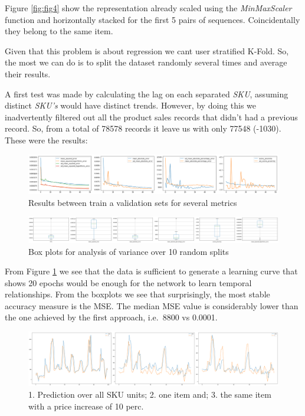 \documentclass[]{article}
\theoremstyle{definition}
\theoremstyle{definition}
\theoremstyle{definition}
\theoremstyle{remark}
\begin{document}
Figure \ref{fig:fig4} show the representation already scaled using the
\emph{MinMaxScaler} function and horizontally stacked for the first 5
pairs of sequences. Coincidentally they belong to the same item.

Given that this problem is about regression we cant user stratified
K-Fold. So, the most we can do is to split the dataset randomly several
times and average their results.

A first test was made by calculating the lag on each separated
\emph{SKU}, assuming distinct \emph{SKU's} would have distinct trends.
However, by doing this we inadvertently filtered out all the product
sales records that didn't had a previous record. So, from a total of
78578 records it leave us with only 77548 (-1030). These were the
results:

\begin{figure}

{\centering \includegraphics[width=1\linewidth]{./media/res_1} 

}

\caption{Results between train a validation sets for several metrics}\label{fig:fig5}
\end{figure}\begin{figure}

{\centering \includegraphics[width=1\linewidth]{./media/box_1} 

}

\caption{Box plots for analysis of variance over 10 random splits}\label{fig:fig6}
\end{figure}

From Figure \ref{fig:fig5} we see that the data is sufficient to
generate a learning curve that shows 20 epochs would be enough for the
network to learn temporal relationships. From the boxplots we see that
surprisingly, the most stable accuracy measure is the MSE. The median
MSE value is considerably lower than the one achieved by the first
approach, i.e.~8800 vs 0.0001.

\begin{figure}

{\centering \includegraphics[width=0.8\linewidth]{./media/pred} 

}

\caption{1. Prediction over all SKU units; 2. one item and; 3. the same item with a price increase of 10 perc.}\label{fig:fig7}
\end{figure}
\end{document}

